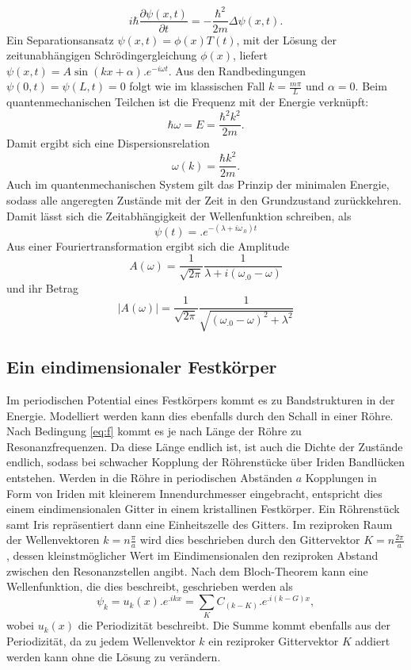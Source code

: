 \[
i\hbar\frac{\partial\psi(x,t)}{\partial t}=-\frac{\hbar^2}{2m}\Delta\psi(x,t)\text{.}
\]
Ein Separationsansatz $\psi(x,t)=\phi(x)T(t)$, mit der Lösung der zeitunabhängigen Schrödingergleichung $\phi(x)$, liefert
$\psi(x,t)=A\sin(kx+\alpha) .e^{-i\omega t}$. Aus den Randbedingungen 
$\psi(0,t)=\psi(L,t)=0$ folgt wie im klassischen Fall $k=\frac{m\pi}{L}$ und $\alpha=0$.
Beim quantenmechanischen Teilchen ist die Frequenz mit der Energie verknüpft:
\[
\hbar\omega=E=\frac{\hbar^2k^2}{2m}\text{.}
\]
Damit ergibt sich eine Dispersionsrelation
\begin{equation}
\omega(k)=\frac{\hbar k^2}{2m}\text{.}\label{eq:w_q}
\end{equation}
Auch im quantenmechanischen System gilt das Prinzip der minimalen Energie, sodass alle angeregten Zustände mit der Zeit in den Grundzustand zurückkehren. Damit lässt sich die Zeitabhängigkeit der Wellenfunktion schreiben, als
\[
\psi(t)=.e^{-(\lambda+i\omega_.0)t}
\]
Aus einer Fouriertransformation ergibt sich die Amplitude
\[
A(\omega)=\frac{1}{\sqrt{2\pi}}\frac{1}{\lambda+i(\omega_.0-\omega)}
\]
und ihr Betrag
\begin{equation}
|A(\omega)|=\frac{1}{\sqrt{2\pi}}\frac{1}{\sqrt{(\omega_.0-\omega)^2+\lambda^2}}
\end{equation}

\subsection{Ein eindimensionaler Festkörper}

Im periodischen Potential eines Festkörpers kommt es zu Bandstrukturen in der Energie. Modelliert werden kann dies ebenfalls durch den Schall in einer Röhre. Nach Bedingung \eqref{eq:f} kommt es je nach Länge der Röhre zu Resonanzfrequenzen. Da diese Länge endlich ist, ist auch die Dichte der Zustände endlich, sodass bei schwacher Kopplung der Röhrenstücke über Iriden Bandlücken entstehen. Werden in die Röhre in periodischen Abständen $a$ Kopplungen in Form von Iriden mit kleinerem Innendurchmesser eingebracht, entspricht dies einem eindimensionalen Gitter in einem kristallinen Festkörper. Ein Röhrenstück samt Iris repräsentiert dann eine Einheitszelle des Gitters. Im reziproken Raum der Wellenvektoren $k=n\frac{\pi}{a}$ wird dies beschrieben durch den Gittervektor $K=n\frac{2\pi}{a}$, dessen kleinstmöglicher Wert im Eindimensionalen den reziproken Abstand zwischen den Resonanzstellen angibt.
Nach dem Bloch-Theorem kann eine Wellenfunktion, die dies beschreibt, geschrieben werden als
\[
\psi_k=u_k(x) .e^{.i k x}=\sum_K C_{(k-K)} .e^{.i (k-G)x},
\]
wobei $u_k(x)$ die Periodizität beschreibt. Die Summe kommt ebenfalls aus der Periodizität, da zu jedem Wellenvektor $k$ ein reziproker Gittervektor $K$ addiert werden kann ohne die Lösung zu verändern.

